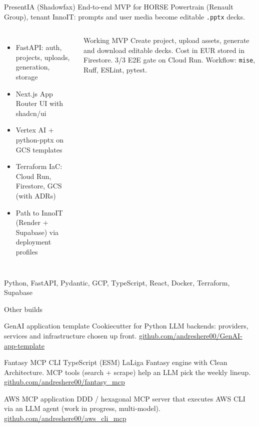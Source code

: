 \documentclass[10pt]{beamer}
\begin{document}
\begin{frame}{PresentIA (Shadowfax)}
  End-to-end MVP for HORSE Powertrain (Renault Group), tenant InnoIT:
  prompts and user media become editable \texttt{.pptx} decks.

  \begin{columns}[T,onlytextwidth]
      \begin{itemize}
        \item FastAPI: auth, projects, uploads, generation, storage
        \item Next.js App Router UI with shadcn/ui
        \item Vertex AI + python-pptx on GCS templates
        \item Terraform IaC: Cloud Run, Firestore, GCS (with ADRs)
        \item Path to InnoIT (Render + Supabase) via deployment profiles
      \end{itemize}
      \begin{alertblock}{Working MVP}
        Create project, upload assets, generate and download editable decks.
        Cost in EUR stored in Firestore. 3/3 E2E gate on Cloud Run.
        Workflow: \texttt{mise}, Ruff, ESLint, pytest.
      \end{alertblock}
  \end{columns}

  {\footnotesize Python, FastAPI, Pydantic, GCP, TypeScript, React, Docker,
  Terraform, Supabase}
\end{frame}

\begin{frame}{Other builds}
  \begin{block}{GenAI application template}
    Cookiecutter for Python LLM backends: providers, services and
    infrastructure chosen up front.
    \href{https://github.com/andreshere00/GenAI-app-template}{github.com/andreshere00/GenAI-app-template}
  \end{block}

  \begin{exampleblock}{Fantasy MCP CLI}
    TypeScript (ESM) LaLiga Fantasy engine with Clean Architecture.
    MCP tools (search + scrape) help an LLM pick the weekly lineup.
    \href{https://github.com/andreshere00/fantasy_mcp}{github.com/andreshere00/fantasy\_mcp}
  \end{exampleblock}

  \begin{alertblock}{AWS MCP application}
    DDD / hexagonal MCP server that executes AWS CLI via an LLM agent
    (work in progress, multi-model).
    \href{https://github.com/andreshere00/aws_cli_mcp}{github.com/andreshere00/aws\_cli\_mcp}
  \end{alertblock}
\end{frame}
\end{document}
